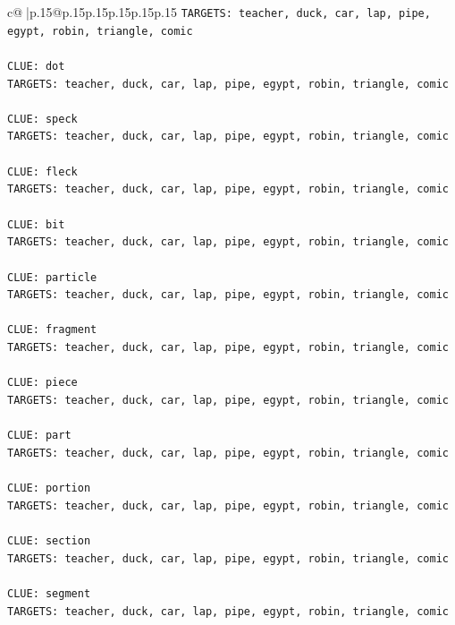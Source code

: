 \documentclass{article}
\begin{document}
{\begin{supertabular}{c@{$\;$}|p{.15\linewidth}@{}p{.15\linewidth}p{.15\linewidth}p{.15\linewidth}p{.15\linewidth}p{.15\linewidth}}
{{{\texttt{TARGETS: teacher, duck, car, lap, pipe, egypt, robin, triangle, comic} \\
\\ 
\texttt{CLUE: dot} \\
\texttt{TARGETS: teacher, duck, car, lap, pipe, egypt, robin, triangle, comic} \\
\\ 
\texttt{CLUE: speck} \\
\texttt{TARGETS: teacher, duck, car, lap, pipe, egypt, robin, triangle, comic} \\
\\ 
\texttt{CLUE: fleck} \\
\texttt{TARGETS: teacher, duck, car, lap, pipe, egypt, robin, triangle, comic} \\
\\ 
\texttt{CLUE: bit} \\
\texttt{TARGETS: teacher, duck, car, lap, pipe, egypt, robin, triangle, comic} \\
\\ 
\texttt{CLUE: particle} \\
\texttt{TARGETS: teacher, duck, car, lap, pipe, egypt, robin, triangle, comic} \\
\\ 
\texttt{CLUE: fragment} \\
\texttt{TARGETS: teacher, duck, car, lap, pipe, egypt, robin, triangle, comic} \\
\\ 
\texttt{CLUE: piece} \\
\texttt{TARGETS: teacher, duck, car, lap, pipe, egypt, robin, triangle, comic} \\
\\ 
\texttt{CLUE: part} \\
\texttt{TARGETS: teacher, duck, car, lap, pipe, egypt, robin, triangle, comic} \\
\\ 
\texttt{CLUE: portion} \\
\texttt{TARGETS: teacher, duck, car, lap, pipe, egypt, robin, triangle, comic} \\
\\ 
\texttt{CLUE: section} \\
\texttt{TARGETS: teacher, duck, car, lap, pipe, egypt, robin, triangle, comic} \\
\\ 
\texttt{CLUE: segment} \\
\texttt{TARGETS: teacher, duck, car, lap, pipe, egypt, robin, triangle, comic} \\
}}}
\end{supertabular}}
\end{document}
